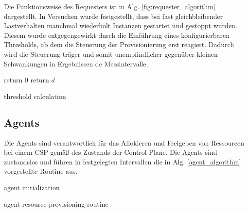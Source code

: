 \documentclass[runningheads]{llncs}
\begin{document}
Die Funktionsweise des Requesters ist in Alg. \ref{fig:requester_algorithm} dargestellt. In Versuchen wurde festgestellt, dass bei fast gleichbleibender Lastverhalten manchmal wiederholt Instanzen gestartet und gestoppt wurden. Diesem wurde entgegengewirkt durch die Einführung eines konfigurierbaren Thresholds, ab dem die Steuerung der Provisionierung erst reagiert. Dadurch  wird die Steuerung  träger und somit unempfindlicher gegenüber kleinen Schwankungen in Ergebnissen de Messintervalle. \\


\begin{algorithm}[H]
	\DontPrintSemicolon
	{
		return 0
	}
	return $d$
	
	\caption{threshold calculation}
\end{algorithm}

\subsection{Agents}

Die Agents sind verantwortlich für das Allokieren und Freigeben von Ressourcen bei einem CSP gemäß des Zustands der Control-Plane. Die Agents sind zustandslos und führen in festgelegten Intervallen die in Alg. \ref{agent_algorithm} vorgestellte Routine aus. \\

\begin{algorithm}[H]
	\DontPrintSemicolon
	agent initialization\;
	\caption{agent resource provisioning routine}
	\label{agent_algorithm}
\end{algorithm}
\end{document}
